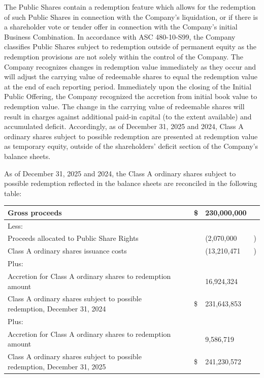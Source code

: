 \documentclass[11pt,a4paper]{article}
\begin{document}
The Public Shares contain a redemption feature which allows for the redemption of such Public Shares in connection with the Company's liquidation, or if there is a shareholder vote or tender offer in connection with the Company's initial Business Combination. In accordance with ASC 480-10-S99, the Company classifies Public Shares subject to redemption outside of permanent equity as the redemption provisions are not solely within the control of the Company. The Company recognizes changes in redemption value immediately as they occur and will adjust the carrying value of redeemable shares to equal the redemption value at the end of each reporting period. Immediately upon the closing of the Initial Public Offering, the Company recognized the accretion from initial book value to redemption value. The change in the carrying value of redeemable shares will result in charges against additional paid-in capital (to the extent available) and accumulated deficit. Accordingly, as of December 31, 2025 and 2024, Class A ordinary shares subject to possible redemption are presented at redemption value as temporary equity, outside of the shareholders' deficit section of the Company's balance sheets.

As of December 31, 2025 and 2024, the Class A ordinary shares subject to possible redemption reflected in the balance sheets are reconciled in the following table:

\begin{table}[h]
\begin{tabular}{|l|l|l|l|l|}
\hline
Gross proceeds &  & \$ & 230,000,000 &  \\ \hline
Less: &  &  &  &  \\ \hline
Proceeds allocated to Public Share Rights &  &  & (2,070,000 & ) \\ \hline
Class A ordinary shares issuance costs &  &  & (13,210,471 & ) \\ \hline
Plus: &  &  &  &  \\ \hline
Accretion for Class A ordinary shares to redemption amount &  &  & 16,924,324 &  \\ \hline
Class A ordinary shares subject to possible redemption, December 31, 2024 &  & \$ & 231,643,853 &  \\ \hline
Plus: &  &  &  &  \\ \hline
Accretion for Class A ordinary shares to redemption amount &  &  & 9,586,719 &  \\ \hline
Class A ordinary shares subject to possible redemption, December 31, 2025 &  & \$ & 241,230,572 &  \\ \hline
\end{tabular}
\end{table}
\end{document}
